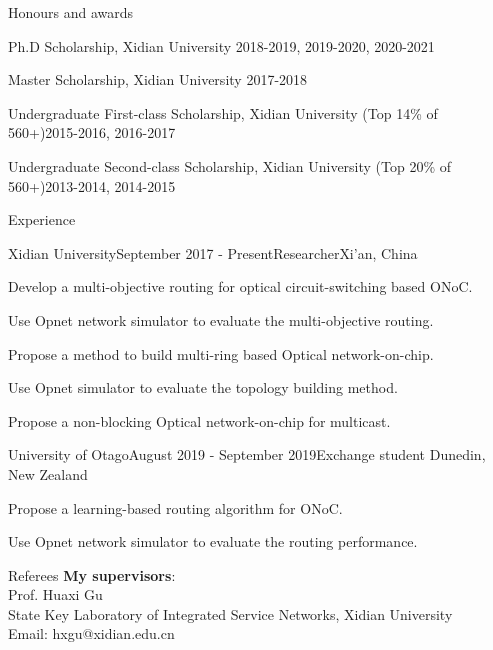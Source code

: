 \documentclass{resume} %
\begin{document}
\begin{rSection}{Honours and awards}
	\begin{rSubsection}{}{}{}{}
		\item Ph.D Scholarship, Xidian University \hfill {2018-2019, 2019-2020, 2020-2021}
		\item Master Scholarship, Xidian University \hfill {2017-2018}
		\item Undergraduate First-class Scholarship, Xidian University (Top 14\% of 560+)\hfill {2015-2016, 2016-2017}
		\item Undergraduate Second-class Scholarship, Xidian University (Top 20\% of 560+)\hfill {2013-2014, 2014-2015}


	\end{rSubsection}
	
\end{rSection}

\begin{rSection}{Experience}
	
	\begin{rSubsection}{Xidian University}{September 2017 - Present}{Researcher}{Xi'an, China}
	\item Develop a multi-objective routing for optical circuit-switching based ONoC.
	\item Use Opnet network simulator to evaluate the multi-objective routing.	
	\item Propose a method to build multi-ring based Optical network-on-chip.
	\item Use Opnet simulator to evaluate the topology building method.	
	\item Propose a non-blocking Optical network-on-chip for multicast.
	
    \end{rSubsection}	
	
	\begin{rSubsection}{University of Otago}{August 2019 - September 2019}{Exchange student }{Dunedin, New Zealand}
		\item Propose a learning-based routing algorithm for ONoC.
		\item Use Opnet network simulator to evaluate the routing performance.	
	\end{rSubsection}


\end{rSection}



\begin{rSection}{Referees}
	{\bf My supervisors}: \\
	Prof. Huaxi Gu \\
	State Key Laboratory of Integrated Service Networks, Xidian University \\
	Email: hxgu@xidian.edu.cn

\end{rSection}
\end{document}
